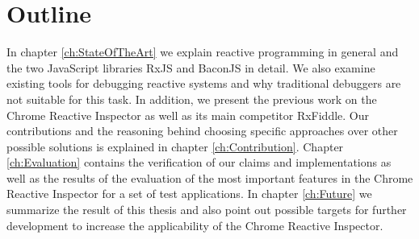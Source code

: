 \section{Outline}
In chapter \ref{ch:StateOfTheArt} we explain reactive programming in general and the two JavaScript libraries RxJS and BaconJS in detail. We also examine existing tools for debugging reactive systems and why traditional debuggers are not suitable for this task. In addition, we present the previous work on the Chrome Reactive Inspector as well as its main competitor RxFiddle.
Our contributions and the reasoning behind choosing specific approaches over other possible solutions is explained in chapter \ref{ch:Contribution}.
Chapter \ref{ch:Evaluation} contains the verification of our claims and implementations as well as the results of the evaluation of the most important features in the Chrome Reactive Inspector for a set of test applications.
In chapter \ref{ch:Future} we summarize the result of this thesis and also point out possible targets for further development to increase the applicability of the Chrome Reactive Inspector.
